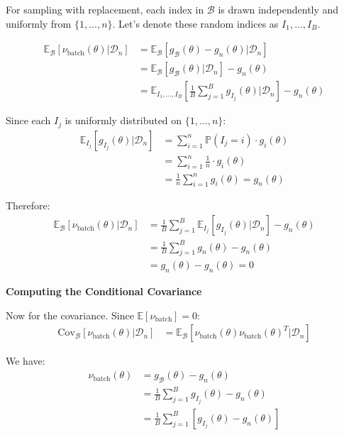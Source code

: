\documentclass[11pt]{article}
\begin{document}
For sampling with replacement, each index in $\mathcal{B}$ is drawn independently and uniformly from $\{1, ..., n\}$. Let's denote these random indices as $I_1, ..., I_B$.

\begin{align}
\mathbb{E}_{\mathcal{B}}[\nu_{\text{batch}}(\theta) | \mathcal{D}_n] &= \mathbb{E}_{\mathcal{B}}[g_{\mathcal{B}}(\theta) - g_n(\theta) | \mathcal{D}_n] \\
&= \mathbb{E}_{\mathcal{B}}[g_{\mathcal{B}}(\theta) | \mathcal{D}_n] - g_n(\theta) \\
&= \mathbb{E}_{I_1,...,I_B}\left[\frac{1}{B} \sum_{j=1}^B g_{I_j}(\theta) \bigg| \mathcal{D}_n\right] - g_n(\theta)
\end{align}

Since each $I_j$ is uniformly distributed on $\{1, ..., n\}$:
\begin{align}
\mathbb{E}_{I_j}[g_{I_j}(\theta) | \mathcal{D}_n] &= \sum_{i=1}^n \mathbb{P}(I_j = i) \cdot g_i(\theta) \\
&= \sum_{i=1}^n \frac{1}{n} \cdot g_i(\theta) \\
&= \frac{1}{n} \sum_{i=1}^n g_i(\theta) = g_n(\theta)
\end{align}

Therefore:
\begin{align}
\mathbb{E}_{\mathcal{B}}[\nu_{\text{batch}}(\theta) | \mathcal{D}_n] &= \frac{1}{B} \sum_{j=1}^B \mathbb{E}_{I_j}[g_{I_j}(\theta) | \mathcal{D}_n] - g_n(\theta) \\
&= \frac{1}{B} \sum_{j=1}^B g_n(\theta) - g_n(\theta) \\
&= g_n(\theta) - g_n(\theta) = 0
\end{align}

\textbf{Computing the Conditional Covariance}

Now for the covariance. Since $\mathbb{E}[\nu_{\text{batch}}] = 0$:
\begin{align}
\text{Cov}_{\mathcal{B}}[\nu_{\text{batch}}(\theta) | \mathcal{D}_n] &= \mathbb{E}_{\mathcal{B}}[\nu_{\text{batch}}(\theta) \nu_{\text{batch}}(\theta)^T | \mathcal{D}_n]
\end{align}

We have:
\begin{align}
\nu_{\text{batch}}(\theta) &= g_{\mathcal{B}}(\theta) - g_n(\theta) \\
&= \frac{1}{B} \sum_{j=1}^B g_{I_j}(\theta) - g_n(\theta) \\
&= \frac{1}{B} \sum_{j=1}^B [g_{I_j}(\theta) - g_n(\theta)]
\end{align}
\end{document}
